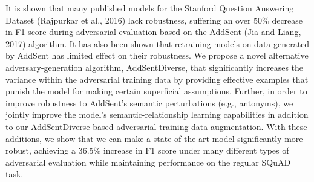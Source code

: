 It is shown that many published models for the Stanford Question Answering Dataset (Rajpurkar et al., 2016) lack robustness, suffering an over 50\% decrease in F1 score during adversarial evaluation based on the AddSent (Jia and Liang, 2017) algorithm. It has also been shown that retraining models on data generated by AddSent has limited effect on their robustness. We propose a novel alternative adversary-generation algorithm, AddSentDiverse, that significantly increases the variance within the adversarial training data by providing effective examples that punish the model for making certain superficial assumptions. Further, in order to improve robustness to AddSent's semantic perturbations (e.g., antonyms), we jointly improve the model's semantic-relationship learning capabilities in addition to our AddSentDiverse-based adversarial training data augmentation. With these additions, we show that we can make a state-of-the-art model significantly more robust, achieving a 36.5\% increase in F1 score under many different types of adversarial evaluation while maintaining performance on the regular SQuAD task.
